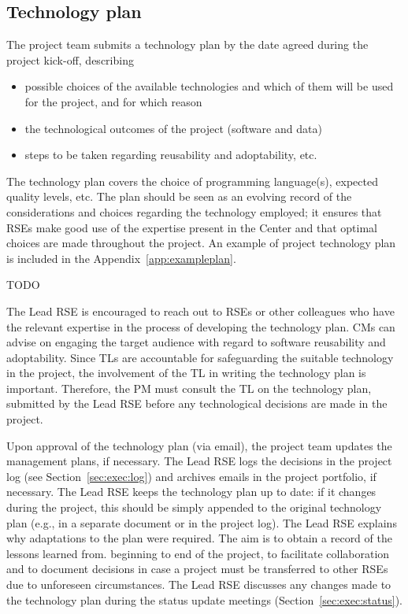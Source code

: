 \documentclass[11pt]{article}
\begin{document}
\subsection{Technology plan}
\label{sec:init:techplan}

The project team submits a technology plan by the date agreed during the project kick-off, describing
\begin{itemize}
\item possible choices of the available technologies and which of them will be used for the project, and for which reason
\item the technological outcomes of the project (software and data) 
\item steps to be taken regarding reusability and adoptability, etc. 
\end{itemize}
The technology plan covers the choice of programming language(s), expected quality levels, etc. The plan should be seen
as an evolving record of the considerations and choices regarding the technology employed; it ensures that RSEs make
good use of the expertise present in the Center and that optimal choices are made throughout the project. An example of
project technology plan is included in the Appendix~\ref{app:exampleplan}.

TODO

The Lead RSE is encouraged to reach out to RSEs or other colleagues who have the relevant expertise in the process of
developing the technology plan. CMs can advise on engaging the target audience with regard to software reusability and
adoptability. Since TLs are accountable for safeguarding the suitable technology in the project, the involvement of the
TL in writing the technology plan is important. Therefore, the PM must consult the TL on the technology plan, submitted
by the Lead RSE before any technological decisions are made in the project.

Upon approval of the technology plan (via email), the project team updates the management plans, if necessary. The Lead
RSE logs the decisions in the project log (see Section~\ref{sec:exec:log}) and archives emails in the project
portfolio, if necessary. The Lead RSE keeps the technology plan up to date: if it changes during the project, this
should be simply appended to the original technology plan (e.g., in a separate document or in the project log). The
Lead RSE explains why adaptations to the plan were required. The aim is to obtain a record of the lessons learned from.
beginning to end of the project, to facilitate collaboration and to document decisions in case a project must be
transferred to other RSEs due to unforeseen circumstances. The Lead RSE discusses any changes made to the technology
plan during the status update meetings (Section~\ref{sec:exec:status}).
\end{document}

